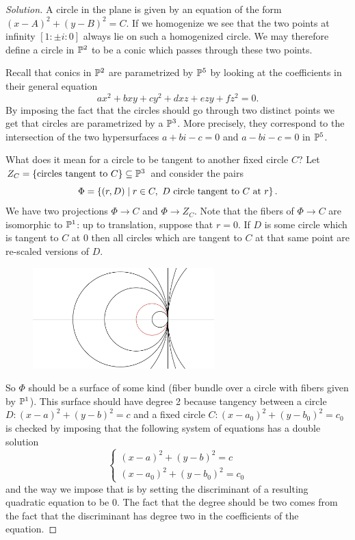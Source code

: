 \begin{proof}[Solution]
A circle in the plane is given by an equation of the form $(x-A)^2+(y-B)^2=C$. If we homogenize we see that the two points at infinity $[1:\pm i:0]$ always lie on such a homogenized circle. We may therefore define a circle in $\mathbb{P}^2$ to be a conic which passes through these two points.

Recall that conics in $\mathbb{P}^2$ are parametrized by $\mathbb{P}^5$ by looking at the coefficients in their general equation
\[ax^2+bxy+cy^2+dxz+ezy+fz^2=0.\]
By imposing the fact that the circles should go through two distinct points we get that circles are parametrized by a $\mathbb{P}^3$. More precisely, they correspond to the intersection of the two hypersurfaces $a+bi-c=0$ and $a-bi-c=0$ in $\mathbb{P}^5$.


What does it mean for a circle to be tangent to another fixed circle $C$? Let $Z_C=\left\{{\text{circles tangent to $C$}}\right\}\subseteq\mathbb{P}^3$ and consider the pairs
\[\Phi=\left\{{(r,D)\mid r\in C,\ D \text{ circle tangent to $C$ at $r$}}\right\}.\]
We have two projections $\Phi\to C$ and $\Phi\to Z_C$. Note that the fibers of $\Phi\to C$ are isomorphic to $\mathbb{P}^1$: up to translation, suppose that $r=0$. If $D$ is some circle which is tangent to $C$ at $0$ then all circles which are tangent to $C$ at that same point are re-scaled versions of $D$. 

\begin{figure}[!htb]
	\centering
	\includegraphics[width=7cm]{Images/pencil-of-tangent-circles.png}
\end{figure}

So $\Phi$ should be a surface of some kind (fiber bundle over a circle with fibers given by $\mathbb{P}^1$). This surface should have degree 2 because tangency between a circle $D:(x-a)^2+(y-b)^2=c$ and a fixed circle $C:(x-a_0)^2+(y-b_0)^2=c_0$ is checked by imposing that the following system of equations has a double solution 
\[\begin{cases}
	(x-a)^2+(y-b)^2=c\\
	(x-a_0)^2+(y-b_0)^2=c_0
\end{cases}\]
and the way we impose that is by setting the discriminant of a resulting quadratic equation to be 0. The fact that the degree should be two comes from the fact that the discriminant has degree two in the coefficients of the equation.


\end{proof}
